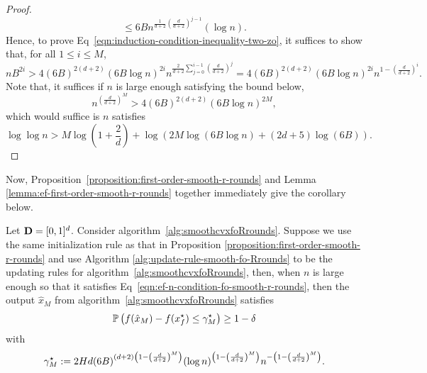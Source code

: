 \begin{proof}
\begin{equation*}
	\leq 6 B n^{\frac{1}{d+2}(\frac{d}{d+2})^{j-1}} (\log n).
\end{equation*}
Hence, to prove Eq~\eqref{eqn:induction-condition-inequality-two-zo}, it 
suffices to show that, for all $1\leq i\leq M$, 
\begin{equation*}
nB^{2i} > 4 (6B)^{2(d+2)}(6B \log n)^{2i}
	n^{\frac{2}{d+2}\sum_{j=0}^{i-1} \left(\frac{d}{d+2}\right)^j}
	= 4 (6B)^{2(d+2)} (6B \log n)^{2i} n^{1- \left(\frac{d}{d+2}\right)^i}.
\end{equation*}
Note that, it suffices if $n$ is large enough satisfying the bound below, 
\begin{equation*}
n^{\left(\frac{d}{d+2}\right)^M} > 4 (6B)^{2(d+2)} (6B\log n)^{2M}, 
\end{equation*}
which would suffice is $n$ satisfies
\begin{equation*}
\log \log n > M \log \left(1+ \frac{2}{d}\right)
	+ \log \left(2M \log(6B \log n) + (2d+5)\log (6B)\right).
\end{equation*}
\end{proof}
Now, Proposition~\ref{proposition:first-order-smooth-r-rounds} and Lemma 
\ref{lemma:ef-first-order-smooth-r-rounds} together immediately give the 
corollary below. 

\begin{corollary}
\label{corollary:first-order-smooth-r-rounds}
Let $\mathbf{D} = [0, 1]^d$. Consider algorithm~\ref{alg:smoothcvxfoRrounds}. 
Suppose we use the same initialization rule as that in Proposition
\ref{proposition:first-order-smooth-r-rounds} and use Algorithm
\ref{alg:update-rule-smooth-fo-Rrounds} to be the updating rules 
for algorithm~\ref{alg:smoothcvxfoRrounds}, then, when $n$ is large enough 
so that it satisfies Eq~\eqref{eqn:ef-n-condition-fo-smooth-r-rounds}, then
the output $\hat{x}_M$ from algorithm~\ref{alg:smoothcvxfoRrounds} satisfies 
\begin{equation*}
\mathbb{P}\left(f(\hat{x}_M) - f(x_f^\star) \leq \gamma_M^\star \right)\geq 1-\delta
\end{equation*}
with 
\begin{equation*}
\gamma_M^\star := 2 Hd (6B)^{(d+2) \left(1-\left(\frac{d}{d+2}\right)^M\right)}
		(\log n)^{\left(1 - \left(\frac{d}{d+2}\right)^M\right)}
		n^{-\left(1 - \left(\frac{d}{d+2}\right)^M\right)}.
\end{equation*}
\end{corollary}


